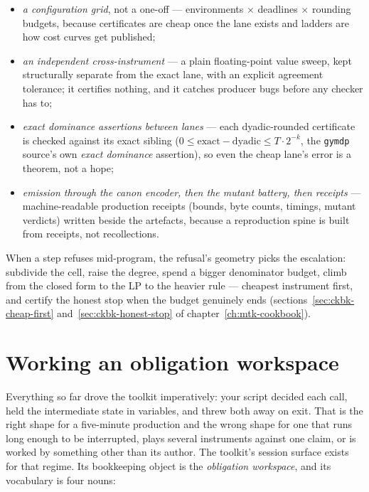 \begin{itemize}
\item \emph{a configuration grid}, not a one-off --- environments
  $\times$ deadlines $\times$ rounding budgets, because certificates
  are cheap once the lane exists and ladders are how cost curves get
  published;
\item \emph{an independent cross-instrument} --- a plain
  floating-point value sweep, kept structurally separate from the
  exact lane, with an explicit agreement tolerance; it certifies
  nothing, and it catches producer bugs before any checker has to;
\item \emph{exact dominance assertions between lanes} --- each
  dyadic-rounded certificate is checked against its exact sibling
  ($0 \le \text{exact} - \text{dyadic} \le T\cdot 2^{-k}$, the
  \texttt{gymdp} source's own \emph{exact dominance} assertion), so
  even the cheap lane's error is a theorem, not a hope;
\item \emph{emission through the canon encoder, then the mutant
  battery, then receipts} --- machine-readable production receipts
  (bounds, byte counts, timings, mutant verdicts) written beside the
  artefacts, because a reproduction spine is built from receipts,
  not recollections.
\end{itemize}

\noindent When a step refuses mid-program, the refusal's geometry
picks the escalation: subdivide the cell, raise the degree, spend a
bigger denominator budget, climb from the closed form to the LP to
the heavier rule --- cheapest instrument first, and certify the
honest stop when the budget genuinely ends
(sections~\ref{sec:ckbk-cheap-first} and~\ref{sec:ckbk-honest-stop}
of chapter~\ref{ch:mtk-cookbook}).

\section{Working an obligation workspace}
\label{sec:tut-session}

Everything so far drove the toolkit imperatively: your script decided
each call, held the intermediate state in variables, and threw both
away on exit. That is the right shape for a five-minute production
and the wrong shape for one that runs long enough to be interrupted,
plays several instruments against one claim, or is worked by
something other than its author. The toolkit's session surface
exists for that regime. Its bookkeeping object is the
\emph{obligation workspace}, and its vocabulary is four nouns:

